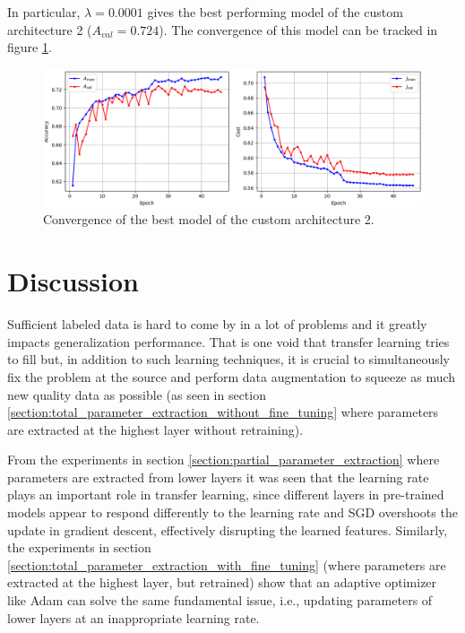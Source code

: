 In particular, $\lambda = 0.0001$ gives the best performing model of the custom architecture 2 ($A_{val} = 0.724$). The convergence of this model can be tracked in figure \ref{fig:custom2_best_training}.

\begin{figure}[ht]
    \centering
    \includegraphics[width=1.0\textwidth]{figs/custom2_best_training.png}
    \caption{Convergence of the best model of the custom architecture 2.}
    \label{fig:custom2_best_training}
\end{figure}

\section{Discussion}

Sufficient labeled data is hard to come by in a lot of problems and it greatly impacts generalization performance. That is one void that transfer learning tries to fill but, in addition to such learning techniques, it is crucial to simultaneously fix the problem at the source and perform data augmentation to squeeze as much new quality data as possible (as seen in section \ref{section:total_parameter_extraction_without_fine_tuning} where parameters are extracted at the highest layer without retraining).

From the experiments in section \ref{section:partial_parameter_extraction} where parameters are extracted from lower layers it was seen that the learning rate plays an important role in transfer learning, since different layers in pre-trained models appear to respond differently to the learning rate and \ac{SGD} overshoots the update in gradient descent, effectively disrupting the learned features. Similarly, the experiments in section \ref{section:total_parameter_extraction_with_fine_tuning} (where parameters are extracted at the highest layer, but retrained) show that an adaptive optimizer like Adam can solve the same fundamental issue, i.e., updating parameters of lower layers at an inappropriate learning rate.

